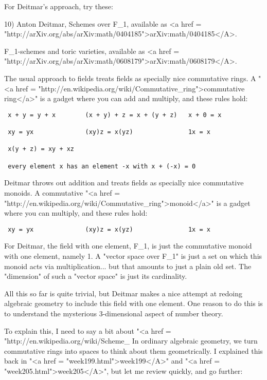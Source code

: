 For Deitmar's approach, try these:

10) Anton Deitmar, Schemes over F_{1}, available as <a href = "http://arXiv.org/abs/arXiv:math/0404185">arXiv:math/0404185</A>.

F_{1}-schemes and toric varieties, available as <a href = "http://arXiv.org/abs/arXiv:math/0608179">arXiv:math/0608179</A>.

The usual approach to fields treats fields as specially nice
commutative rings.  A "<a href =
"http://en.wikipedia.org/wiki/Commutative_ring">commutative
ring</a>" is a gadget where you can add and multiply, and these
rules hold:

\begin{verbatim}
 x + y = y + x        (x + y) + z = x + (y + z)   x + 0 = x

 xy = yx              (xy)z = x(yz)               1x = x

 x(y + z) = xy + xz 

 every element x has an element -x with x + (-x) = 0
\end{verbatim}
    

Deitmar throws out addition and treats fields as specially nice
commutative monoids.  A commutative "<a href =
"http://en.wikipedia.org/wiki/Commutative_ring">monoid</a>" is a gadget where you can multiply, and these rules
hold:

\begin{verbatim}
 xy = yx              (xy)z = x(yz)               1x = x
\end{verbatim}
    

For Deitmar, the field with one element, F_{1}, is just the
commutative monoid with one element, namely 1.  A "vector space
over F_{1}" is just a set on which this monoid acts via
multiplication... but that amounts to just a plain old set.  The
"dimension" of such a "vector space" is just its
cardinality.

All this so far is quite trivial, but Deitmar makes a nice attempt at 
redoing algebraic geometry to include this field with one element.  
One reason to do this is to understand the mysterious 3-dimensional
aspect of number theory.  

To explain this, I need to say a bit about "<a href =
"http://en.wikipedia.org/wiki/Scheme_%
In ordinary algebraic geometry, we turn commutative rings into spaces
to think about them geometrically.  I explained this back in "<a
href = "week199.html">week199</A>" and "<a href =
"week205.html">week205</A>", but let me review quickly, and go
further:

